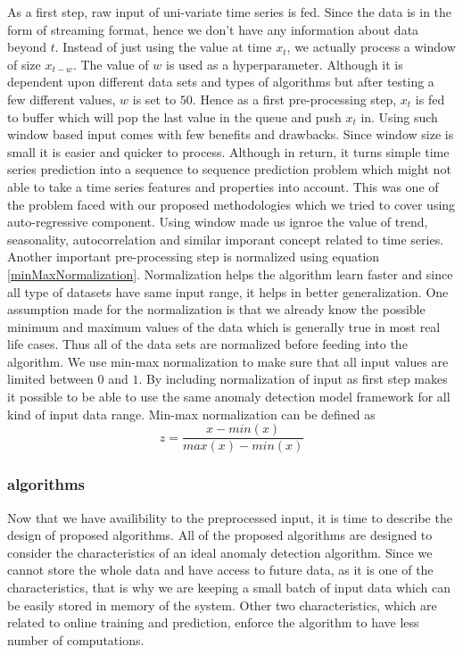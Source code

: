 \documentclass[12pt]{article}
\begin{document}
As a first step, raw input of uni-variate time series is fed. Since the data is in the form of streaming format, hence we don't have any information about data beyond $t$. Instead of just using the value at time $x_t$, we actually process a window of size $x_{t-w}$. The value of $w$ is used as a hyperparameter. Although it is dependent upon different data sets and types of algorithms but after testing a few different values, $w$ is set to $50$. Hence as a first pre-processing step, $x_t$ is fed to buffer which will pop the last value in the queue and push $x_t$ in. Using such window based input comes with few benefits and drawbacks. Since window size is small it is easier and quicker to process. Although in return, it turns simple time series prediction into a sequence to sequence prediction problem which might not able to take a time series features and properties into account. This was one of the problem faced with our proposed methodologies which we tried to cover using auto-regressive component. Using window made us ignroe the value of trend, seasonality, autocorrelation and similar imporant concept related to time series.\\
\break
Another important pre-processing step is normalized using equation \ref{minMaxNormalization}. Normalization helps the algorithm learn faster and since all type of datasets have same input range, it helps in better generalization. One assumption made for the normalization is that we already know the possible minimum and maximum values of the data which is generally true in most real life cases. Thus all of the data sets are normalized before feeding into the algorithm.
We use min-max normalization to make sure that all input values are limited between $0$ and $1$. By including normalization of input as first step makes it possible to be able to use the same anomaly detection model framework for all kind of input data range. Min-max normalization can be defined as
\begin{equation}
    z = \frac{x - min(x)}{max(x) - min(x)}
    \label{minMaxNormalization}
\end{equation}
\subsubsection{algorithms}
Now that we have availibility to the preprocessed input, it is time to describe the design of proposed algorithms. All of the proposed algorithms are designed to consider the characteristics of an ideal anomaly detection algorithm. Since we cannot store the whole data and have access to future data, as it is one of the characteristics, that is why we are keeping a small batch of input data which can be easily stored in memory of the system. Other two characteristics, which are related to online training and prediction, enforce the algorithm to have less number of computations.\\
\break
\end{document}
